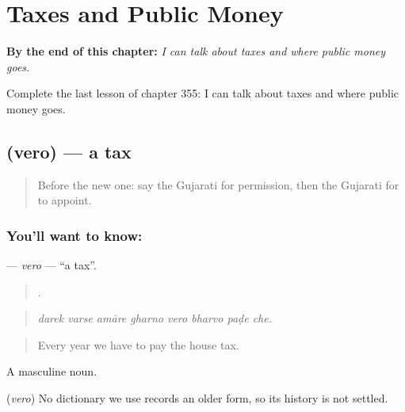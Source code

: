 
\chapter{Taxes and Public Money}
\label{ch:gu-taxes-and-public-money}

\begin{chapteropening}
\textbf{By the end of this chapter:} \emph{I can talk about taxes and where public money goes.}

Complete the last lesson of chapter 355: I can talk about taxes and where public money goes.
\end{chapteropening}

\section[\texorpdfstring{\gu{વેરો} (vero)}{વેરો (vero)}]{ (vero) — a tax}

\label{lesson:GU-C355-vero}



\begin{quote}
Before the new one: say the Gujarati for permission, then the Gujarati for to appoint.
\end{quote}

\subsection*{You'll want to know: }
\textbf{} — \emph{vero} — \textquotedblleft{}a tax\textquotedblright{}.

\begin{quote}
       .
\end{quote}

\begin{quote}
\emph{darek varse amāre gharno vero bharvo paḍe che.}
\end{quote}

\begin{quote}
Every year we have to pay the house tax.
\end{quote}

A masculine noun.

\begin{cousinweb}
\textbf{} (\emph{vero}) No dictionary we use records an older form, so its history is not settled.
\end{cousinweb}

